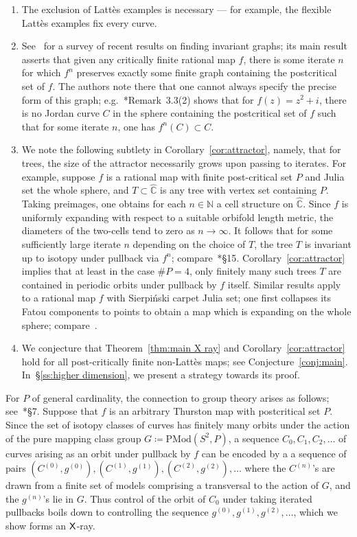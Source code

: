 \documentclass{amsart}
\newcommand\C{{\mathbb{C}}}
\newcommand\N{{\mathbb{N}}}
\newcommand{\rs}{\widehat{\C}}
\theoremstyle{definition}
\theoremstyle{remark}
\newcommand{\sfX}{{\sf X}}
\begin{document}
\begin{enumerate}
\item The exclusion of Latt\`es examples is necessary --- for example, the flexible Latt\`es examples fix every curve.  

\item See~\cite{MR4423808} for a survey of recent results on finding invariant graphs; its main result asserts that given any critically finite rational map $f$, there is some iterate $n$ for which $f^n$ preserves exactly some finite graph containing the postcritical set of $f$. The authors note there that one cannot always specify the precise form of this graph; e.g.~\cite{MR4423808}*{Remark~3.3(2)} shows that for $f(z)=z^2+i$, there is no Jordan curve $C$ in the sphere containing the postcritical set of $f$ such that for some iterate $n$, one has $f^n(C)\subset C$.  

\item We note the following subtlety in Corollary~\ref{cor:attractor}, namely, that for trees, the size of the attractor necessarily grows upon passing to iterates. For example, suppose $f$ is a rational map with finite post-critical set $P$ and Julia set the whole sphere, and $T\subset \rs$ is any tree with vertex set containing $P$.  Taking preimages, one obtains for each $n\in \N$ a cell structure on $\rs$.  Since $f$ is uniformly expanding with respect to a suitable orbifold length metric, the diameters of the two-cells tend to zero as $n\to\infty$. It follows that for some sufficiently large iterate $n$ depending on the choice of $T$, the tree $T$ is invariant up to isotopy under pullback via $f^n$; compare~\cite{MR3727134}*{\S15}.  Corollary~\ref{cor:attractor} implies that at least in the case $\#P=4$, only finitely many such trees $T$  are contained in periodic orbits under pullback by $f$ itself. Similar results apply to a rational map $f$ with Sierpi\'nski carpet Julia set; one first collapses its Fatou components to points to obtain a map which is expanding on the whole sphere; compare~\cite{MR3774834}.

\item We conjecture that Theorem~\ref{thm:main X ray} and Corollary~\ref{cor:attractor} hold for all post-critically finite non-Latt\`es maps; see Conjecture~\ref{conj:main}. In~\S\ref{ss:higher dimension}, we present a strategy towards its proof.
\end{enumerate}

For $P$ of general cardinality, the connection to group theory arises as follows; see~\cite{kmp:tw:published}*{\S7}. Suppose that $f$ is an arbitrary Thurston map with postcritical set $P$.  Since the set of isotopy classes of curves has finitely many orbits under the action of the pure mapping class group $G\coloneqq\text{PMod}(S^2,P)$, a sequence $C_0, C_1, C_2, \ldots$ of curves arising as an orbit under pullback by $f$ can be encoded by a a sequence of pairs $(C^{(0)}, g^{(0)}), (C^{(1)}, g^{(1)}),  (C^{(2)}, g^{(2)}), \ldots$ where the $C^{(n)}$'s are drawn from a finite set of models comprising a transversal to the action of $G$, and the $g^{(n)}$'s lie in $G$.  Thus control of the orbit of $C_0$ under taking iterated  pullbacks boils down to controlling the sequence $g^{(0)}, g^{(1)}, g^{(2)}, \ldots$, which we show forms an $\sfX$-ray.  
\end{document}
